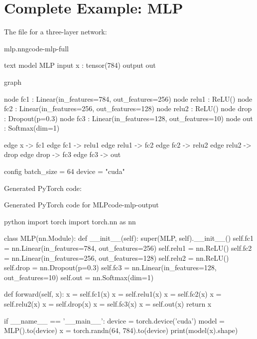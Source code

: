 \documentclass{nngraph-en}
\begin{document}
\section{Complete Example: MLP}

The  file for a three-layer network:

\begin{codebox}{mlp.nng}{code-mlp-full}
\begin{amzcode}{text}
model MLP {
    input  x   : tensor(784)
    output out
}

graph {
    node fc1   : Linear(in_features=784, out_features=256)
    node relu1 : ReLU()
    node fc2   : Linear(in_features=256, out_features=128)
    node relu2 : ReLU()
    node drop  : Dropout(p=0.3)
    node fc3   : Linear(in_features=128, out_features=10)
    node out   : Softmax(dim=1)

    edge x     -> fc1
    edge fc1   -> relu1
    edge relu1 -> fc2
    edge fc2   -> relu2
    edge relu2 -> drop
    edge drop  -> fc3
    edge fc3   -> out
}

config {
    batch_size = 64
    device = "cuda"
}
\end{amzcode}
\end{codebox}

Generated PyTorch code:

\begin{codebox}{Generated PyTorch code for MLP}{code-mlp-output}
\begin{amzcode}{python}
import torch
import torch.nn as nn


class MLP(nn.Module):
    def __init__(self):
        super(MLP, self).__init__()
        self.fc1   = nn.Linear(in_features=784, out_features=256)
        self.relu1 = nn.ReLU()
        self.fc2   = nn.Linear(in_features=256, out_features=128)
        self.relu2 = nn.ReLU()
        self.drop  = nn.Dropout(p=0.3)
        self.fc3   = nn.Linear(in_features=128, out_features=10)
        self.out   = nn.Softmax(dim=1)

    def forward(self, x):
        x = self.fc1(x)
        x = self.relu1(x)
        x = self.fc2(x)
        x = self.relu2(x)
        x = self.drop(x)
        x = self.fc3(x)
        x = self.out(x)
        return x


if __name__ == '__main__':
    device = torch.device('cuda')
    model  = MLP().to(device)
    x      = torch.randn(64, 784).to(device)
    print(model(x).shape)
\end{amzcode}
\end{codebox}
\end{document}
